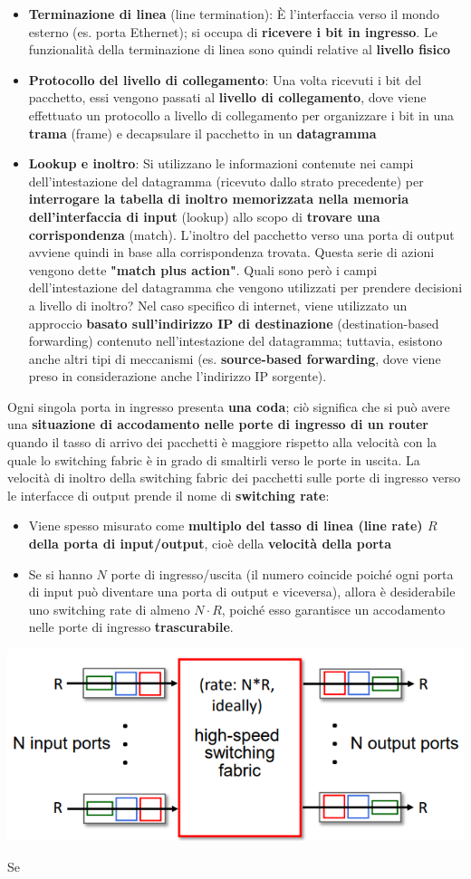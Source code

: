 \documentclass[12pt]{article}
\begin{document}
\begin{itemize}
    \item \textbf{Terminazione di linea} (line termination): È l'interfaccia verso il mondo esterno (es. porta Ethernet); si occupa di \textbf{ricevere i bit in ingresso}. Le funzionalità della terminazione di linea sono quindi
    relative al \textbf{livello fisico}
    \item \textbf{Protocollo del livello di collegamento}: Una volta ricevuti i bit del pacchetto, essi vengono passati al \textbf{livello di collegamento}, dove viene effettuato un protocollo a livello di collegamento per organizzare i bit in una \textbf{trama} (frame) e decapsulare il pacchetto in un \textbf{datagramma}
    \item \textbf{Lookup e inoltro}: Si utilizzano le informazioni contenute nei campi dell'intestazione del datagramma (ricevuto dallo strato precedente) per \textbf{interrogare la tabella di inoltro memorizzata nella memoria dell'interfaccia di input} (lookup) allo scopo di \textbf{trovare una corrispondenza} (match). 
    L'inoltro del pacchetto verso una porta di output avviene quindi in base alla corrispondenza trovata. Questa serie di azioni vengono dette \textbf{"match plus action"}.
    Quali sono però i campi dell'intestazione del datagramma che vengono utilizzati per prendere decisioni a livello di inoltro?
    Nel caso specifico di internet, viene utilizzato un approccio \textbf{basato sull'indirizzo IP di destinazione} (destination-based forwarding) contenuto nell'intestazione del datagramma;
    tuttavia, esistono anche altri tipi di meccanismi (es. \textbf{source-based forwarding}, dove viene preso in considerazione anche l'indirizzo IP sorgente).
\end{itemize}
Ogni singola porta in ingresso presenta \textbf{una coda}; ciò significa che si può avere una \textbf{situazione di accodamento nelle porte di ingresso di un router} quando il tasso di arrivo dei pacchetti è maggiore rispetto alla velocità con la quale lo switching fabric è in grado di smaltirli verso le porte in uscita.
La velocità di inoltro della switching fabric dei pacchetti sulle porte di ingresso verso le interfacce di output prende il nome di \textbf{switching rate}:
\begin{itemize}
    \item Viene spesso misurato come \textbf{multiplo del tasso di linea (line rate) $R$ della porta di input/output}, cioè della \textbf{velocità della porta}
    \item Se si hanno $N$ porte di ingresso/uscita (il numero coincide poiché ogni porta di input può diventare una porta di output e viceversa), allora è desiderabile uno switching rate di almeno $N \cdot R$, poiché esso garantisce un accodamento nelle porte di ingresso \textbf{trascurabile}.
\end{itemize}
\begin{center}
    \includegraphics[width = 0.70\linewidth]{Images/79.png}
\end{center}
Se 
\end{document}
